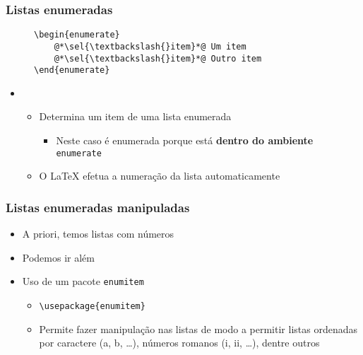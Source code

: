 \begin{frame}[fragile] \frametitle{Listas enumeradas}
\begin{figure}[!t]
\begin{lstlisting}
\begin{enumerate}
	@*\sel{\textbackslash{}item}*@ Um item
	@*\sel{\textbackslash{}item}*@ Outro item
\end{enumerate}
\end{lstlisting}
\end{figure}

\begin{itemize}
	\item {}
	\begin{itemize}
		\item Determina um item de uma lista enumerada
		\begin{itemize}
			\item Neste caso é enumerada porque está \textbf{dentro do ambiente} \texttt{enumerate}
		\end{itemize}
		\item O LaTeX efetua a numeração da lista automaticamente
	\end{itemize}
\end{itemize}
\end{frame}

\begin{frame}[fragile] \frametitle{Listas enumeradas manipuladas}

\begin{itemize}
	\item A priori, temos listas com números
	\item Podemos ir além
	\item Uso de um pacote \texttt{enumitem}
	\begin{itemize}
		\item \texttt{\textbackslash{}usepackage\{enumitem\}}
		\item Permite fazer manipulação nas listas de modo a permitir listas ordenadas por caractere (a, b, \ldots), números romanos (i, ii, \ldots), dentre outros
	\end{itemize}
\end{itemize}
\end{frame}

